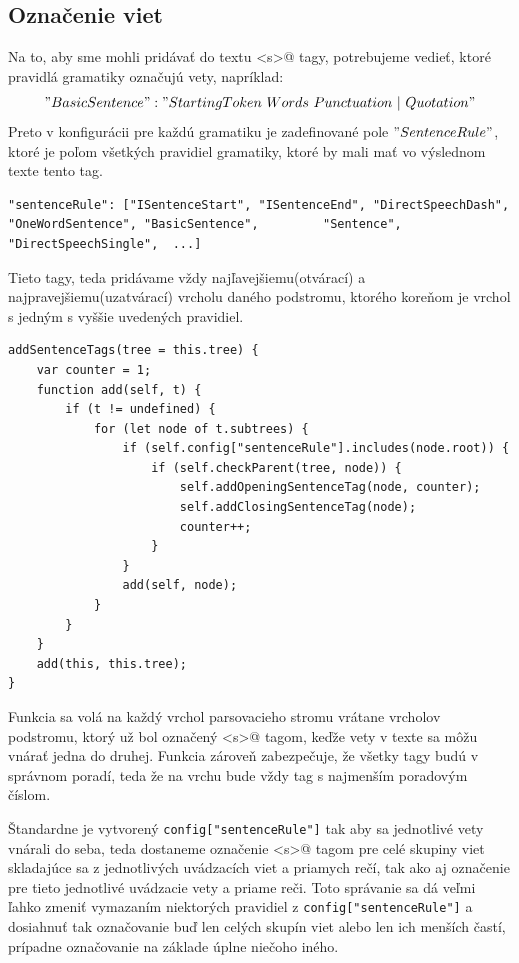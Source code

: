 \documentclass[12pt,a4paper]{report}
\theoremstyle{definition}
\theoremstyle{remark}
\begin{document}
\subsection{Označenie viet}
Na to, aby sme mohli pridávať do textu \verb@<s>@ tagy, potrebujeme vedieť, ktoré pravidlá gramatiky označujú vety, napríklad: $$"BasicSentence": "StartingToken\ Words\ Punctuation\ |\ Quotation"$$ Preto v konfigurácii pre každú gramatiku je zadefinované pole $"SentenceRule"$, ktoré je poľom všetkých pravidiel gramatiky, ktoré by mali mať vo výslednom texte tento tag.

\begin{lstlisting}[style=htmlcssjs]
"sentenceRule": ["ISentenceStart", "ISentenceEnd", "DirectSpeechDash", "OneWordSentence", "BasicSentence",         "Sentence", "DirectSpeechSingle",  ...]
\end{lstlisting}

Tieto tagy, teda pridávame vždy najľavejšiemu(otvárací) a najpravejšiemu(uzatvárací) vrcholu daného podstromu, ktorého koreňom je vrchol s jedným s vyššie uvedených pravidiel.
\begin{lstlisting}[style=htmlcssjs]
addSentenceTags(tree = this.tree) {
	var counter = 1;
	function add(self, t) {
		if (t != undefined) {
			for (let node of t.subtrees) {
				if (self.config["sentenceRule"].includes(node.root)) {
					if (self.checkParent(tree, node)) {
						self.addOpeningSentenceTag(node, counter);
						self.addClosingSentenceTag(node);
						counter++;
					}
				}
				add(self, node);
			}
		}
	}
	add(this, this.tree);
}
\end{lstlisting}

Funkcia sa volá na každý vrchol parsovacieho stromu vrátane vrcholov podstromu, ktorý už bol označený \verb@<s>@ tagom, keďže vety v texte sa môžu vnárať jedna do druhej. Funkcia zároveň zabezpečuje, že všetky tagy budú v správnom poradí, teda že na vrchu bude vždy tag s najmenším poradovým číslom.

Štandardne je vytvorený \verb!config["sentenceRule"]! tak aby sa jednotlivé vety vnárali do seba, teda dostaneme označenie \verb@<s>@ tagom pre celé skupiny viet skladajúce sa z jednotlivých uvádzacích viet a priamych rečí, tak ako aj označenie pre tieto jednotlivé uvádzacie vety a priame reči. Toto správanie sa dá veľmi ľahko zmeniť vymazaním niektorých pravidiel z \verb!config["sentenceRule"]! a dosiahnuť tak označovanie buď len celých skupín viet alebo len ich menších častí, prípadne označovanie na základe úplne niečoho iného.
\end{document}
